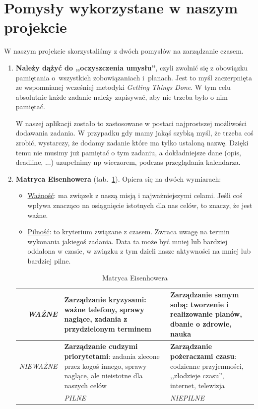 \documentclass[pdflatex,11pt]{aghdpl}
\begin{document}
\section{Pomysły wykorzystane w naszym projekcie}

W naszym projekcie skorzystaliśmy z dwóch pomysłów na zarządzanie czasem.

\begin{enumerate}
\item \textbf{Należy dążyć do ,,oczyszczenia umysłu''}, czyli zwolnić się z obowiązku pamiętania o~wszystkich zobowiązaniach i~planach. Jest to myśl zaczerpnięta ze wspomnianej wcześniej metodyki \textit{Getting Things Done}. W tym celu absolutnie każde zadanie należy zapisywać, aby nie trzeba było o nim pamiętać.

W naszej aplikacji zostało to zastosowane w postaci najprostszej możliwości dodawania zadania. W przypadku gdy mamy jakąś szybką myśl, że trzeba coś zrobić, wystarczy, że dodamy zadanie które ma tylko ustaloną nazwę. Dzięki temu nie musimy już pamiętać o tym zadaniu, a dokładniejsze dane (opis, deadline, ...) uzupełnimy np wieczorem, podczas przeglądania kalendarza.

\item \textbf{Matryca Eisenhowera} (tab.~\ref{tab:matryca}). Opiera się na dwóch wymiarach:
\begin{itemize}
\item \underline{Ważność}: ma związek z naszą misją i najważniejszymi celami. Jeśli coś wpływa znacząco na osiągnięcie istotnych dla nas celów, to znaczy, że jest ważne.
\item \underline{Pilność}: to kryterium związane z czasem. Zwraca uwagę na termin wykonania jakiegoś zadania. Data ta może być mniej lub bardziej oddalona w czasie, w związku z tym dzieli nasze aktywności na mniej lub bardziej pilne.
\end{itemize}

\begin{table}[hbtp]
\centering
\begin{tabular}{r|p{6cm}|p{6cm}}
  \textit{WAŻNE} & \textbf{Zarządzanie kryzysami}: ważne telefony, sprawy naglące, zadania z przydzielonym terminem
                 & \textbf{Zarządzanie samym sobą}: tworzenie i realizowanie planów, dbanie o zdrowie, nauka \\
  \hline
  \textit{NIEWAŻNE} & \textbf{Zarządzanie cudzymi priorytetami}: zadania zlecone przez kogoś innego, sprawy naglące, ale nieistotne dla naszych celów
                 & \textbf{Zarządzanie pożeraczami czasu}: codzienne przyjemności, ,,złodzieje czasu'', internet, telewizja \\
  \hline
   & \textit{PILNE} & \textit{NIEPILNE} \\
\end{tabular}
\caption{Matryca Eisenhowera}
\label{tab:matryca}
\end{table}


\end{enumerate}
\end{document}
